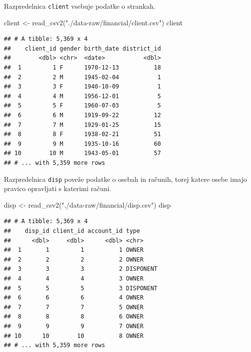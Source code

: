 \documentclass[
]{book}
\newenvironment{Shaded}{\begin{snugshade}}{\end{snugshade}}
\newcommand{\FunctionTok}[1]{\textcolor[rgb]{0.00,0.00,0.00}{#1}}
\newcommand{\NormalTok}[1]{#1}
\newcommand{\OtherTok}[1]{\textcolor[rgb]{0.56,0.35,0.01}{#1}}
\newcommand{\StringTok}[1]{\textcolor[rgb]{0.31,0.60,0.02}{#1}}
\begin{document}
Razpredelnica \texttt{client} vsebuje podatke o strankah.

\begin{Shaded}
\begin{Highlighting}[]
\NormalTok{client }\OtherTok{\textless{}{-}} \FunctionTok{read\_csv2}\NormalTok{(}\StringTok{"./data{-}raw/financial/client.csv"}\NormalTok{)}
\NormalTok{client}
\end{Highlighting}
\end{Shaded}

\begin{verbatim}
## # A tibble: 5,369 x 4
##    client_id gender birth_date district_id
##        <dbl> <chr>  <date>           <dbl>
##  1         1 F      1970-12-13          18
##  2         2 M      1945-02-04           1
##  3         3 F      1940-10-09           1
##  4         4 M      1956-12-01           5
##  5         5 F      1960-07-03           5
##  6         6 M      1919-09-22          12
##  7         7 M      1929-01-25          15
##  8         8 F      1938-02-21          51
##  9         9 M      1935-10-16          60
## 10        10 M      1943-05-01          57
## # ... with 5,359 more rows
\end{verbatim}

Razpredelnica \texttt{disp} poveže podatke o osebah in računih, torej katere osebe imajo pravico opravljati s katerimi računi.

\begin{Shaded}
\begin{Highlighting}[]
\NormalTok{disp }\OtherTok{\textless{}{-}} \FunctionTok{read\_csv2}\NormalTok{(}\StringTok{"./data{-}raw/financial/disp.csv"}\NormalTok{)}
\NormalTok{disp}
\end{Highlighting}
\end{Shaded}

\begin{verbatim}
## # A tibble: 5,369 x 4
##    disp_id client_id account_id type     
##      <dbl>     <dbl>      <dbl> <chr>    
##  1       1         1          1 OWNER    
##  2       2         2          2 OWNER    
##  3       3         3          2 DISPONENT
##  4       4         4          3 OWNER    
##  5       5         5          3 DISPONENT
##  6       6         6          4 OWNER    
##  7       7         7          5 OWNER    
##  8       8         8          6 OWNER    
##  9       9         9          7 OWNER    
## 10      10        10          8 OWNER    
## # ... with 5,359 more rows
\end{verbatim}
\end{document}
